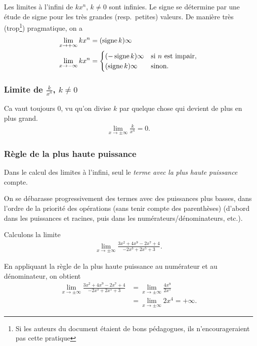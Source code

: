 \documentclass[main.tex]{subfiles}
\begin{document}
Les limites à l'infini de $k x^n$, $k \neq 0$ sont infinies.
Le signe se détermine par une étude de signe pour les très grandes (resp.\ petites) valeurs.
De manière très (trop\footnote{Si les auteurs du document étaient de bons pédagogues, ils n'encourageraient pas cette pratique}) pragmatique,
on a
\begin{align*}
    \lim_{x \to +\infty} k x^n &= (\operatorname{signe} k) \infty\\
    \lim_{x \to -\infty} k x^n &=
    \begin{cases}
        (-\operatorname{signe} k) \infty & \text{si}\ n\ \text{est impair,} \\
        (\operatorname{signe} k) \infty & \text{sinon.}
    \end{cases}
\end{align*}

\subsubsection{Limite de $\frac k {x^n}$, $k \neq 0$}

Ca vaut toujours $0$,
vu qu'on divise $k$ par quelque chose qui devient de plus en plus grand.
\begin{align}
    \lim_{x \to \pm \infty} \frac k {x^n} = 0.
\end{align}

\subsubsection{Règle de la plus haute puissance}

\begin{remark}

    Dans le calcul des limites à l'infini,
    seul le \emph{terme avec la plus haute puissance} compte.

    On se débarasse progressivement des termes avec des puissances plus basses,
    dans l'ordre de la priorité des opérations (sans tenir compte des parenthèses)
    (d'abord dans les puissances et racines, puis dans les numérateurs/dénominateurs, etc.).
\end{remark}

\begin{example}

    Calculons la limite
    \begin{align*}
        \lim_{x \to \pm \infty} \frac {3x^2 + 4 x^9 - 2 x^7 + 4} {-2x^3 + 2x^5 + 3}.
    \end{align*}

    En appliquant la règle de la plus haute puissance au numérateur et au dénominateur,
    on obtient
    \begin{align*}
        \lim_{x \to \pm \infty} \frac {3x^2 + 4 x^9 - 2 x^7 + 4} {-2x^3 + 2x^5 + 3}
        &= \lim_{x \to \pm \infty} \frac {4 x^9} {2 x^5}\\
        &= \lim_{x \to \pm \infty} 2 x^4 = +\infty.
    \end{align*}
\end{example}
\end{document}
